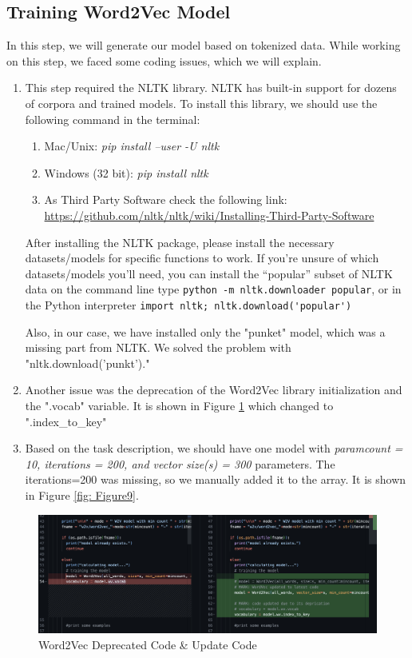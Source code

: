 \subsection{\textbf{Training Word2Vec Model}}
In this step, we will generate our model based on tokenized data. While working on this step, we faced some coding issues, which we will explain.
\begin{enumerate}
\item This step required the NLTK library. NLTK has built-in support for dozens of corpora and trained models. To install this library, we should use the following command in the terminal:
    \begin{enumerate}
        \item Mac/Unix: \textit{pip install --user -U nltk}
        \item Windows (32 bit): \textit{pip install nltk} 
        \item As Third Party Software check the following link: \newline \href{https://github.com/nltk/nltk/wiki/Installing-Third-Party-Software}{https://github.com/nltk/nltk/wiki/Installing-Third-Party-Software}
    \end{enumerate}
    After installing the NLTK package, please install the necessary datasets/models for specific functions to work.
    If you’re unsure of which datasets/models you’ll need, you can install the “popular” subset of NLTK data on the command line type \verb |python -m nltk.downloader popular|, or in the Python interpreter \verb|import nltk; nltk.download('popular')| \cite{nltk}
    
    Also, in our case, we have installed only the "punket" model, which was a missing part from NLTK. We solved the problem with "nltk.download('punkt')."
\item Another issue was the deprecation of the Word2Vec library initialization and the ".vocab" variable. It is shown in Figure \ref{fig: Figure8} which changed to ".index\_to\_key"
\item Based on the task description, we should have one model with \textit{paramcount = 10, iterations = 200, and vector size(s) = 300} parameters. 
\newline The iterations=200 was missing, so we manually added it to the array. It is shown in Figure \ref{fig: Figure9}.
\end{enumerate}
\begin{figure}
    \centering
    \includegraphics[width=1\linewidth]{pictures/word2vec_deprication.png}
    \caption{Word2Vec Deprecated Code \& Update Code}
    \label{fig: Figure8}
\end{figure}


